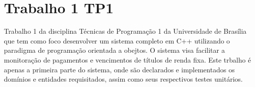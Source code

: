 \chapter{Trabalho 1 TP1}
\hypertarget{md__trabalho-1-_t_p1_2_r_e_a_d_m_e}{}\label{md__trabalho-1-_t_p1_2_r_e_a_d_m_e}
\label{md__trabalho-1-_t_p1_2_r_e_a_d_m_e_autotoc_md0}%
%
Trabalho 1 da disciplina Técnicas de Programação 1 da Universidade de Brasília que tem como foco desenvolver um sistema completo em C++ utilizando o paradigma de programação orientada a obejtos. O sistema visa facilitar a monitoração de pagamentos e vencimentos de títulos de renda fixa. Este trbalho é apenas a primeira parte do sistema, onde são declarados e implementados os domínios e entidades requisitados, assim como seus respectivos testes unitários. 